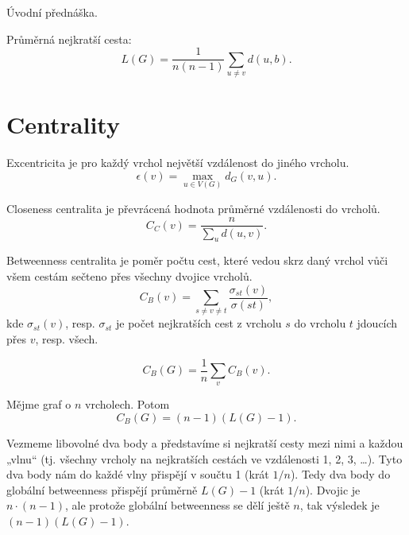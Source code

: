 \documentclass[12pt]{article}					%
\begin{document}
\begin{poznamka}
    Úvodní přednáška.
\end{poznamka}


\begin{definice}
    Průměrná nejkratší cesta:
    $$ L(G) = \frac{1}{n(n-1)} \sum_{u ≠ v} d(u, b). $$ 
\end{definice}

\section{Centrality}

    \begin{definice}[Ekcentricita]
        Excentricita je pro každý vrchol největší vzdálenost do jiného vrcholu.
        $$ \epsilon(v) = \max_{u \in V(G)} d_G(v, u). $$ 
    \end{definice}

    \begin{definice}
        Closeness centralita je převrácená hodnota průměrné vzdálenosti do vrcholů.
        $$ C_C(v) = \frac{n}{\sum_u d(u, v)}. $$ 
    \end{definice}

    \begin{definice}
        Betweenness centralita je poměr počtu cest, které vedou skrz daný vrchol vůči všem cestám sečteno přes všechny dvojice vrcholů.
        $$ C_B(v) = \sum_{s ≠ v ≠ t} \frac{\sigma_{st}(v)}{\sigma(st)}, $$ 
        kde $\sigma_{st}(v)$, resp. $\sigma_{st}$ je počet nejkratších cest z vrcholu $s$ do vrcholu $t$ jdoucích přes $v$, resp. všech.
    \end{definice}

    \begin{definice}
        $$ C_B(G) = \frac{1}{n}\sum_{v} C_B(v). $$
    \end{definice}

    \begin{veta}
        Mějme graf o $n$ vrcholech. Potom
        $$ C_B(G) = (n-1)(L(G) - 1). $$

        \begin{dukazin}
            Vezmeme libovolné dva body a představíme si nejkratší cesty mezi nimi a každou „vlnu“ (tj. všechny vrcholy na nejkratších cestách ve vzdálenosti 1, 2, 3, …). Tyto dva body nám do každé vlny přispějí v součtu 1 (krát $1/n$). Tedy dva body do globální betweenness přispějí průměrně $L(G) - 1$ (krát $1/n$). Dvojic je $n·(n-1)$, ale protože globální betweenness se dělí ještě $n$, tak výsledek je $(n - 1)(L(G) - 1)$.
        \end{dukazin}
    \end{veta}
\end{document}
